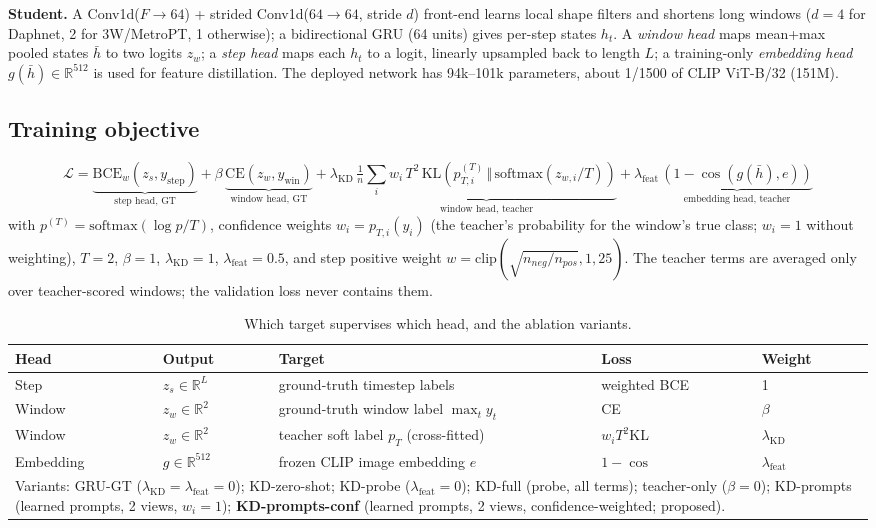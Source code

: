 \documentclass[twoside,english]{article}
\begin{document}
\textbf{Student.} A Conv1d($F\!\to\!64$) + strided Conv1d($64\!\to\!64$, stride $d$) front-end learns local shape filters and shortens long windows ($d=4$ for Daphnet, 2 for 3W/MetroPT, 1 otherwise); a bidirectional GRU (64 units) gives per-step states $h_t$. A \emph{window head} maps mean+max pooled states $\bar h$ to two logits $z_w$; a \emph{step head} maps each $h_t$ to a logit, linearly upsampled back to length $L$; a training-only \emph{embedding head} $g(\bar h)\in\mathbb{R}^{512}$ is used for feature distillation. The deployed network has 94k--101k parameters, about 1/1500 of CLIP ViT-B/32 (151M).

\subsection{Training objective} \label{sec:objective}
\begin{equation}
\mathcal{L}=\underbrace{\mathrm{BCE}_{w}(z_s,y_{\mathrm{step}})}_{\text{step head, GT}}
+\beta\,\underbrace{\mathrm{CE}(z_w,y_{\mathrm{win}})}_{\text{window head, GT}}
+\lambda_{\mathrm{KD}}\,\underbrace{\tfrac{1}{n}\textstyle\sum_i w_i\,T^2\,\mathrm{KL}\!\left(p_{T,i}^{(T)}\,\Vert\,\mathrm{softmax}(z_{w,i}/T)\right)}_{\text{window head, teacher}}
+\lambda_{\mathrm{feat}}\,\underbrace{\left(1-\cos(g(\bar h),e)\right)}_{\text{embedding head, teacher}}
\label{eq:loss}
\end{equation}
with $p^{(T)}=\mathrm{softmax}(\log p/T)$, confidence weights $w_i=p_{T,i}(y_i)$ (the teacher's probability for the window's true class; $w_i=1$ without weighting), $T=2$, $\beta=1$, $\lambda_{\mathrm{KD}}=1$, $\lambda_{\mathrm{feat}}=0.5$, and step positive weight $w=\mathrm{clip}(\sqrt{n_{neg}/n_{pos}},1,25)$. The teacher terms are averaged only over teacher-scored windows; the validation loss never contains them.

\begin{table}[h]
\centering\small
\caption{Which target supervises which head, and the ablation variants.}
\label{tab:heads}
\begin{tabular}{lllll}
\toprule
Head & Output & Target & Loss & Weight \\
\midrule
Step & $z_s\in\mathbb{R}^L$ & ground-truth timestep labels & weighted BCE & 1 \\
Window & $z_w\in\mathbb{R}^2$ & ground-truth window label $\max_t y_t$ & CE & $\beta$ \\
Window & $z_w\in\mathbb{R}^2$ & teacher soft label $p_T$ (cross-fitted) & $w_i T^2$KL & $\lambda_{\mathrm{KD}}$ \\
Embedding & $g\in\mathbb{R}^{512}$ & frozen CLIP image embedding $e$ & $1-\cos$ & $\lambda_{\mathrm{feat}}$ \\
\midrule
\multicolumn{5}{p{6in}}{Variants: GRU-GT ($\lambda_{\mathrm{KD}}{=}\lambda_{\mathrm{feat}}{=}0$); KD-zero-shot; KD-probe ($\lambda_{\mathrm{feat}}{=}0$); KD-full (probe, all terms); teacher-only ($\beta{=}0$); KD-prompts (learned prompts, 2 views, $w_i{=}1$); \textbf{KD-prompts-conf} (learned prompts, 2 views, confidence-weighted; proposed).}\\
\bottomrule
\end{tabular}
\end{table}
\end{document}
